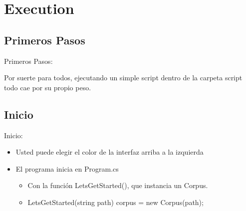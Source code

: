\section*{Execution}

\subsection*{Primeros Pasos}
    \begin{frame}
        Primeros Pasos:
        \begin{center}
            Por suerte para todos, ejecutando un simple script dentro de la carpeta script todo cae por su propio peso.
        \end{center}
    \end{frame}



\subsection*{Inicio}
    \begin{frame}
        Inicio:
        \begin{itemize}
            \item Usted puede elegir el color de la interfaz arriba a la izquierda
            \item El programa inicia en Program.cs
            \begin{itemize}
                \item Con la función LetsGetStarted(), que instancia un Corpus.
                \item LetsGetStarted(string path){ corpus = new Corpus(path); }
            \end{itemize}
        \end{itemize}
    \end{frame}